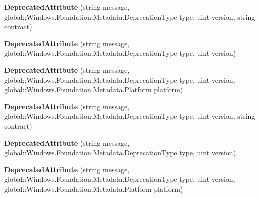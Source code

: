 \begin{DoxyCompactItemize}
{\bfseries Deprecated\+Attribute} (string message, global\+::\+Windows.\+Foundation.\+Metadata.\+Deprecation\+Type type, uint version, string contract)
\item 
\mbox{\label{class_windows_1_1_foundation_1_1_metadata_1_1_deprecated_attribute_a6ab4cdc714aeb94c30e9c44038807120}} 
{\bfseries Deprecated\+Attribute} (string message, global\+::\+Windows.\+Foundation.\+Metadata.\+Deprecation\+Type type, uint version)
\item 
\mbox{\label{class_windows_1_1_foundation_1_1_metadata_1_1_deprecated_attribute_a17e8fceeae3254fa89cd64e410f2ca4e}} 
{\bfseries Deprecated\+Attribute} (string message, global\+::\+Windows.\+Foundation.\+Metadata.\+Deprecation\+Type type, uint version, global\+::\+Windows.\+Foundation.\+Metadata.\+Platform platform)
\item 
\mbox{\label{class_windows_1_1_foundation_1_1_metadata_1_1_deprecated_attribute_aa776754af460f6e292c26901285ed49a}} 
{\bfseries Deprecated\+Attribute} (string message, global\+::\+Windows.\+Foundation.\+Metadata.\+Deprecation\+Type type, uint version, string contract)
\item 
\mbox{\label{class_windows_1_1_foundation_1_1_metadata_1_1_deprecated_attribute_a6ab4cdc714aeb94c30e9c44038807120}} 
{\bfseries Deprecated\+Attribute} (string message, global\+::\+Windows.\+Foundation.\+Metadata.\+Deprecation\+Type type, uint version)
\item 
\mbox{\label{class_windows_1_1_foundation_1_1_metadata_1_1_deprecated_attribute_a17e8fceeae3254fa89cd64e410f2ca4e}} 
{\bfseries Deprecated\+Attribute} (string message, global\+::\+Windows.\+Foundation.\+Metadata.\+Deprecation\+Type type, uint version, global\+::\+Windows.\+Foundation.\+Metadata.\+Platform platform)
\item 
\mbox{\label{class_windows_1_1_foundation_1_1_metadata_1_1_deprecated_attribute_aa776754af460f6e292c26901285ed49a}} 

\end{DoxyCompactItemize}

